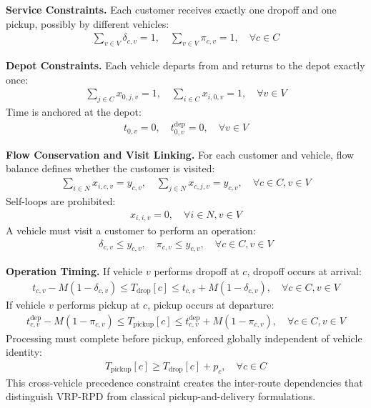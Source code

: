 \documentclass{article}
\begin{document}
\textbf{Service Constraints.}
Each customer receives exactly one dropoff and one pickup, possibly by different
vehicles:
\begin{align}
\sum_{v\in V}\delta_{c,v}=1,\quad \sum_{v\in V}\pi_{c,v}=1,\quad \forall c\in C
\end{align}

\textbf{Depot Constraints.}
Each vehicle departs from and returns to the depot exactly once:
\begin{align}
\sum_{j\in C} x_{0,j,v} = 1,\quad \sum_{i\in C} x_{i,0,v} = 1,\quad \forall v\in V
\end{align}
Time is anchored at the depot:
\begin{align}
t_{0,v}=0,\quad t^{\text{dep}}_{0,v}=0,\quad \forall v\in V
\end{align}

\textbf{Flow Conservation and Visit Linking.}
For each customer and vehicle, flow balance defines whether the customer is
visited:
\begin{align}
\sum_{i\in N} x_{i,c,v} = y_{c,v},\quad \sum_{j\in N} x_{c,j,v} = y_{c,v},
\quad \forall c\in C, v\in V
\end{align}
Self-loops are prohibited:
\begin{align}
x_{i,i,v}=0,\quad \forall i\in N, v\in V
\end{align}
A vehicle must visit a customer to perform an operation:
\begin{align}
\delta_{c,v}\le y_{c,v},\quad \pi_{c,v}\le y_{c,v},\quad \forall c\in C, v\in V
\end{align}

\textbf{Operation Timing.}
If vehicle $v$ performs dropoff at $c$, dropoff occurs at arrival:
\begin{align}
t_{c,v} - M(1-\delta_{c,v}) \le T_{\text{drop}}[c] \le t_{c,v} + M(1-\delta_{c,v}),
\quad \forall c\in C, v\in V
\end{align}
If vehicle $v$ performs pickup at $c$, pickup occurs at departure:
\begin{align}
t^{\text{dep}}_{c,v} - M(1-\pi_{c,v}) \le T_{\text{pickup}}[c] \le
t^{\text{dep}}_{c,v} + M(1-\pi_{c,v}),
\quad \forall c\in C, v\in V
\end{align}
Processing must complete before pickup, enforced globally independent of vehicle
identity:
\begin{align}
T_{\text{pickup}}[c] \ge T_{\text{drop}}[c] + p_c,\quad \forall c\in C
\end{align}
This cross-vehicle precedence constraint creates the inter-route dependencies
that distinguish VRP-RPD from classical pickup-and-delivery formulations.
\end{document}
